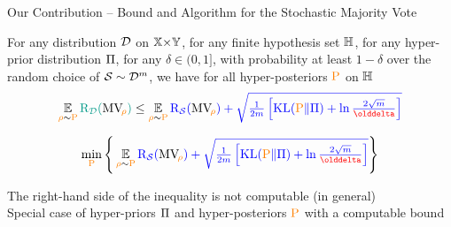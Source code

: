 \documentclass{slides}
\begin{document}
\begin{xframe}{Our Contribution -- {\small Bound and Algorithm for the Stochastic Majority Vote}}

    \vfill

    \begin{redbox}{}
        
        {\scriptsize For any distribution $\mathcal{D}$ on $\mathbb{X}{\times}\mathbb{Y}$, for any finite hypothesis set $\mathbb{H}$, for any hyper-prior distribution $\Pi$, for any $\delta \in (0, 1]$, with probability at least $1-\delta$ over the random choice of $\mathcal{S}\sim\mathcal{D}^m$, we have for all hyper-posteriors $\textcolor{orange}{\mathrm{P}}$ on $\mathbb{H}$}\\[-0.5cm]
     \begin{align*}
       \EE_{\Q\sim\hyperQ}\green{\Risk_{\D}(\MVQ)} \le \EE_{\Q\sim\hyperQ}\blue{\Risk_{\dS}(\MVQ) + \sqrt{\tfrac{1}{2\m}\LB\KL(\hyperQ\|\hyperP) +\ln\tfrac{2\sqrt{\m}}{\delta}\RB}}
    \end{align*}
    \vspace{-0.2cm}
    
       \vspace{-0.5cm}
       
       \begin{align*}
       \min_{\hyperQ}\Bigg\{ \EE_{\Q\sim\hyperQ}\blue{\Risk_{\dS}(\MVQ) + \sqrt{\tfrac{1}{2\m}\LB\KL(\hyperQ\|\hyperP) +\ln\tfrac{2\sqrt{\m}}{\delta}\RB}}\Bigg\}
        \end{align*}
    \end{redbox}
    
    \vspace{-0.1cm}
    \begin{xblock}{}
     The right-hand side of the inequality is not computable (in general)\\[0.2cm]
    \red{$\Rightarrow$} Special case of hyper-priors $\Pi$ and hyper-posteriors $\textcolor{orange}{\mathrm{P}}$ with a computable bound
    \end{xblock}
    
    \vfill
    
\end{xframe}

\end{document}
